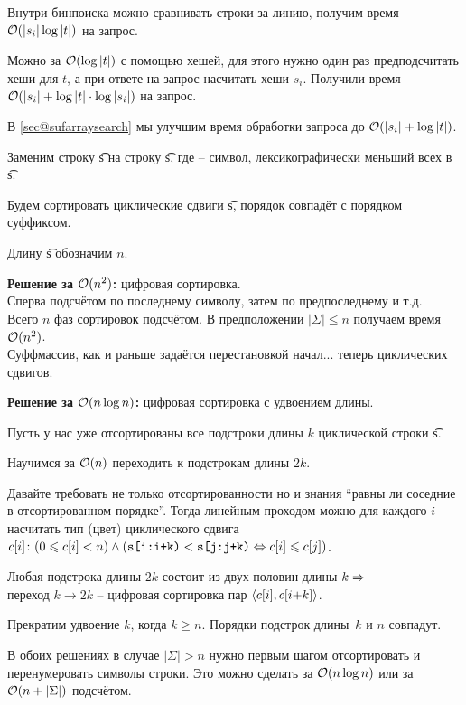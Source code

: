 \down
Внутри бинпоиска можно сравнивать строки за линию, получим время $\mathcal{O}(|s_i| \log |t|)$ на запрос.

Можно за $\mathcal{O}(\log |t|)$ с помощью хешей, для этого нужно один раз предподсчитать хеши для $t$, а при ответе 
на запрос насчитать хеши $s_i$. Получили время $\mathcal{O}(|s_i|+\log |t| \cdot \log |s_i|)$ на запрос.

\down
В \autoref{sec@sufarraysearch} мы улучшим время обработки запроса до $\mathcal{O}(|s_i| + \log |t|)$.


Заменим строку \t{s} на строку \t{s\NO}, где \NO{} -- символ, лексикографически меньший всех в \t{s}.

Будем сортировать циклические сдвиги \t{s\NO}, порядок совпадёт с порядком суффиксом. 

Длину \t{s\NO} обозначим $n$.

\down
{\bf Решение за $\mathcal{O}(n^2)$:} цифровая сортировка.\\
Сперва подсчётом по последнему символу, затем по предпоследнему и т.д.\\
Всего $n$ фаз сортировок подсчётом. В предположении $|\Sigma| \le n$ получаем время $\mathcal{O}(n^2)$. \\
Суффмассив, как и раньше задаётся перестановкой начал... теперь циклических сдвигов.

\down
{\bf Решение за $\mathcal{O}(n \log n)$:} цифровая сортировка с удвоением длины.

Пусть у нас уже отсортированы все подстроки длины $k$ циклической строки \t{s\NO}. 

Научимся за $\mathcal{O}(n)$ переходить к подстрокам длины $2k$.

Давайте требовать не только отсортированности но и знания ``равны ли соседние в отсортированном порядке''.
Тогда линейным проходом можно для каждого $i$ насчитать тип (цвет) циклического сдвига 
$c[i] \colon (0 \leqslant c[i] < n) \wedge (\texttt{s[i:i+k)} < \texttt{s[j:j+k)} \Leftrightarrow c[i] \leqslant c[j])$.

\down
Любая подстрока длины $2k$ состоит из двух половин длины $k \Rightarrow$ \\
переход $k \to 2k$ -- цифровая сортировка пар $\langle c[i],c[i{+}k] \rangle$.

\down
Прекратим удвоение $k$, когда $k \ge n$. Порядки подстрок длины~$k$ и $n$ совпадут.

\begin{Rem}
В обоих решениях в случае $|\Sigma| > n$ нужно первым шагом отсортировать и перенумеровать символы строки.
Это можно сделать за $\mathcal{O}(n \log n)$ или за $\mathcal{O}(n + |\Sigma|)$ подсчётом.
\end{Rem}

